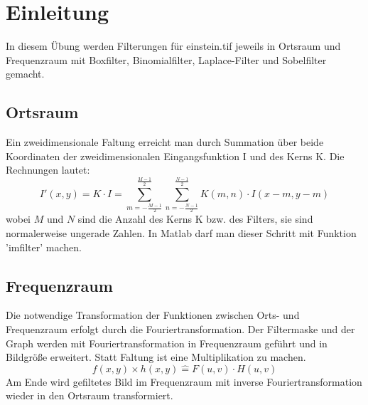 \documentclass[12pt]{article}
\begin{document}
	\pagestyle{main}
\section{Einleitung}
In diesem Übung werden Filterungen für einstein.tif jeweils in Ortsraum und Frequenzraum mit Boxfilter, Binomialfilter, Laplace-Filter und Sobelfilter gemacht.
\begin{figure}[ht]\centering
\end{figure}
\subsection{Ortsraum}
Ein zweidimensionale Faltung erreicht man durch Summation über beide Koordinaten der zweidimensionalen Eingangsfunktion I und des Kerns K. Die Rechnungen lautet:
\begin{equation*}
I'(x,y) = K \cdot I = \sum_{m = -\frac{M-1}{2}}^{\frac{M-1}{2}} \sum_{n = -\frac{N-1}{2}}^{\frac{N-1}{2}} K(m,n) \cdot I(x-m,y-m)
\end{equation*}
wobei $M$ und $N$ sind die Anzahl des Kerns K bzw. des Filters, sie sind normalerweise ungerade Zahlen. In Matlab darf man dieser Schritt mit Funktion 'imfilter' machen. 
\subsection{Frequenzraum}
Die notwendige Transformation der Funktionen zwischen Orts- und Frequenzraum erfolgt durch die Fouriertransformation. Der Filtermaske und der Graph werden mit Fouriertransformation in Frequenzraum geführt und in Bildgröße erweitert. Statt Faltung ist eine Multiplikation zu machen. 
\begin{equation*}
f(x,y) \times h(x,y) \hat{=} F(u,v) \cdot H(u,v)
\end{equation*}
Am Ende wird gefiltetes Bild im Frequenzraum mit inverse Fouriertransformation wieder in den Ortsraum transformiert. 
\newpage
\end{document}
